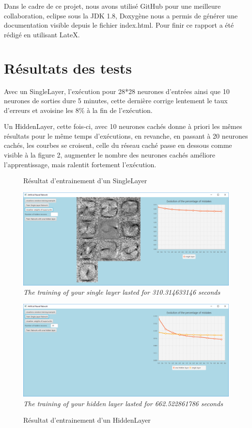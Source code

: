 \documentclass[11pt]{article}
\begin{document}
Dans le cadre de ce projet, nous avons utilisé GitHub pour une meilleure collaboration, eclipse sous la JDK 1.8, Doxygène nous a permis de générer une documentation visible depuis le fichier index.html. \newline Pour finir ce rapport a été rédigé en utilisant LateX.



\section{Résultats des tests}

Avec un SingleLayer, l'exécution pour 28*28 neurones d'entrées ainsi que 10 neurones de sorties dure 5 minutes, cette dernière corrige lentement le taux d'erreurs et avoisine les 8\%
 à la fin de l'exécution. \newline

Un HiddenLayer, cette fois-ci, avec 10 neurones cachés donne à priori les mêmes résultats pour le même temps d'exécutions, en revanche, en passant à 20 neurones cachés, les courbes se croisent, celle du réseau caché passe en dessous comme visible à la figure 2, augmenter le nombre des neurones cachés améliore l'apprentissage, mais ralentit fortement l'exécution.\newline

\begin{figure}[!htb]
  \centering
    \caption{Résultat d'entrainement d'un SingleLayer}
    \includegraphics[width=\textwidth]{single.png}
	\textit {The training of your single layer lasted for 310.314633146 seconds}
\newline \newline

  \centering
    \caption{Résultat d'entrainement d'un HiddenLayer}
    \includegraphics[width=\textwidth]{hidden.png}
	\textit {The training of your hidden layer lasted for 662.522861786 seconds}

\end{figure}
\end{document}
